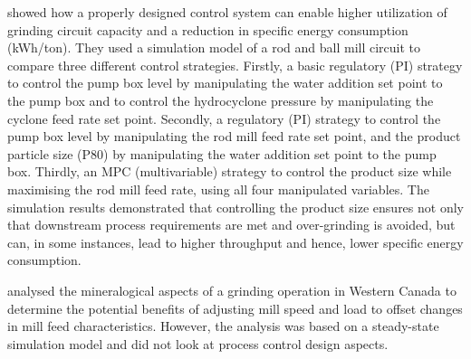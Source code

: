 \cite{bouchard_reducing_2017} showed how a properly designed control system can enable higher utilization of grinding circuit capacity and a reduction in specific energy consumption (\gls{kWh}/ton). They used a simulation model of a rod and ball mill circuit to compare three different control strategies. Firstly, a basic regulatory (\gls{PI}) strategy to control the pump box level by manipulating the water addition set point to the pump box and to control the hydrocyclone pressure by manipulating the cyclone feed rate set point. Secondly, a regulatory (\gls{PI}) strategy to control the pump box level by manipulating the rod mill feed rate set point, and the product particle size (\gls{P80}) by manipulating the water addition set point to the pump box. Thirdly, an \gls{MPC} (multivariable) strategy to control the product size while maximising the rod mill feed rate, using all four manipulated variables. The simulation results demonstrated that controlling the product size ensures not only that downstream process requirements are met and over-grinding is avoided, but can, in some instances, lead to higher throughput and hence, lower specific energy consumption.

\cite{liu_development_2018} analysed the mineralogical aspects of a grinding operation in Western Canada to determine the potential benefits of adjusting mill speed and load to offset changes in mill feed characteristics. However, the analysis was based on a steady-state simulation model and did not look at process control design aspects.


%

